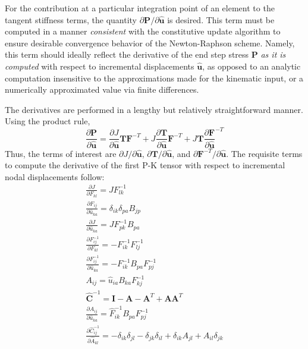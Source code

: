 For the contribution at a particular integration point of an element to the tangent stiffness terms, the quantity $\partial{\bm{P}}/\partial{\hat{\bm{u}}}$ is desired. This term must be computed in a manner \textit{consistent} with the constitutive update algorithm to ensure desirable convergence behavior of the Newton-Raphson scheme. Namely, this term should ideally reflect the derivative of the end step stress $\bm{P}$ \textit{as it is computed} with respect to incremental displacements $\hat{\bm{u}}$, as opposed to an analytic computation insensitive to the approximations made for the kinematic input, or a numerically approximated value via finite differences.

The derivatives are performed in a lengthy but relatively straightforward manner. Using the product rule,
\begin{equation}
\frac{\partial {\bm P}}{\partial \hat{{\bm u}}} = \frac{\partial J}{\partial \hat{\bm u}}{\bm T}{\bm F}^{-T} + J\frac{\partial {\bm T}}{\partial \hat{\bm u}}{\bm F}^{-T} + J{\bm T}\frac{\partial {\bm F}}{\partial \hat{\bm u}}^{-T}
\end{equation}
Thus, the terms of interest are ${\partial J}/{\partial \hat{\bm{u}}}$, ${\partial \bm{T}}/{\partial \hat{\bm{u}}}$, and ${\partial \bm{F}^{-T}}/{\partial \hat{\bm{u}}}$. The requisite terms to compute the derivative of the first P-K tensor with respect to incremental nodal displacements follow:
\begin{gather}
\frac{\partial J}{\partial F_{kl}} = JF_{lk}^{{-1}} \\
\frac{\partial F_{ij}}{\partial \hat{u}_{ka}} = \delta_{ik}\delta_{pa}B_{jp} \\
\frac{\partial J}{\partial \hat{u}_{ka}} = JF_{pk}^{-1}B_{pa} \\
\frac{\partial F_{ij}^{-1}}{\partial F_{kl}} = - F_{ik}^{-1}F_{lj}^{-1} \\
\frac{\partial F_{ij}^{-1}}{\partial \hat{u}_{ka}} = - F_{ik}^{-1}B_{pa}F_{pj}^{-1} \\
A_{ij} = \hat{u}_{ia}B_{ka}F^{-1}_{kj} \\
\hat{{\bm C}}^{-1} = {\bm I} - {\bm A} - {\bm A}^T + {\bm A}{\bm A}^T \\
\frac{\partial A_{ij}}{\partial \hat{u}_{ka}} = \hat{F}^{-1}_{ik}B_{pa}F^{-1}_{pj} \\
\frac{\partial \hat{C}^{-1}_{ij}}{\partial \hat{A}_{kl}} = -\delta_{ik}\delta_{jl} - \delta_{jk}\delta_{il} + \delta_{ik}A_{jl} + A_{il}\delta_{jk}
\end{gather}
